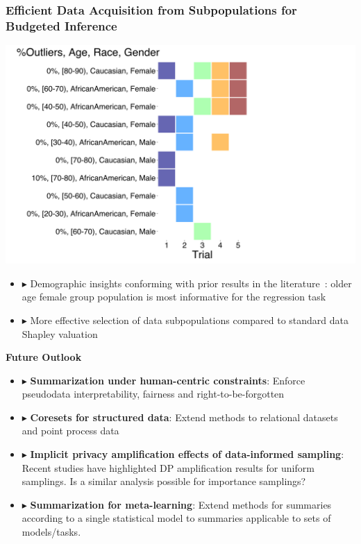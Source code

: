 \documentclass[hyperref={colorlinks = true},unknownkeysallowed]{beamer}
\let\oldcitep=\citep
\renewcommand\citep[1]{\hypersetup{linkcolor=UBCblue}\hyperlink{#1}{\oldcitep{#1}}}
\begin{document}
\begin{frame}
	\frametitle{Efficient Data Acquisition from Subpopulations for Budgeted Inference}
	\centering
	\includegraphics[width=.49\textwidth]{figs/selected_groups.png}	
	\pause 
	\begin{itemize}
		\item $\blacktriangleright$ Demographic insights conforming with prior results in the literature~\citep{ghorbani19}: older age female group population is most informative for the regression task
		\item $\blacktriangleright$ More effective selection of data subpopulations compared to standard data Shapley valuation~\citep{shapley53}
	\end{itemize}
\end{frame}





\begin{frame}
	\LARGE{\textbf{Future Outlook}}
\end{frame}

\begin{frame}
	\begin{itemize}
		\item $\blacktriangleright$  \textbf{Summarization under human-centric constraints}: Enforce pseudodata interpretability, fairness and right-to-be-forgotten
		\item $\blacktriangleright$  \textbf{Coresets for structured data}: Extend methods to relational datasets and point process data
		\item $\blacktriangleright$ \textbf{Implicit privacy amplification effects of data-informed sampling}: Recent studies have highlighted DP amplification results for uniform samplings. Is a similar analysis possible for importance samplings?
		\item $\blacktriangleright$ \textbf{Summarization for meta-learning}: Extend methods for summaries according to a single statistical model to summaries applicable to sets of models/tasks.
	\end{itemize}
\end{frame}
\end{document}
